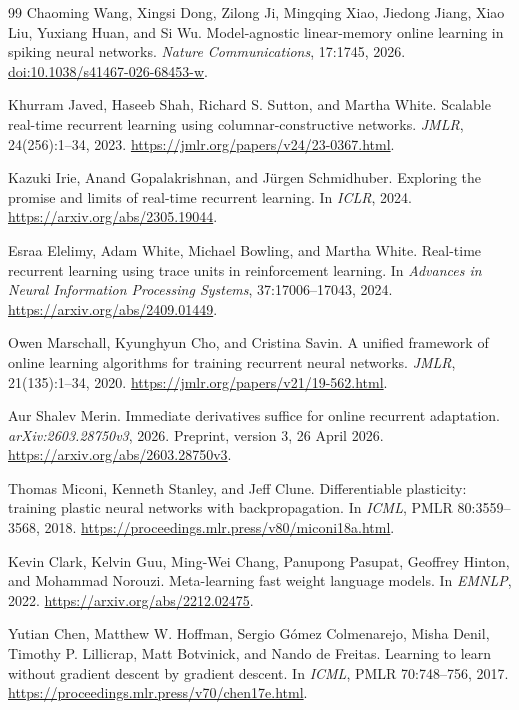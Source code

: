 \documentclass[11pt]{article}
\theoremstyle{definition}
\begin{document}
\begin{thebibliography}{99}
Chaoming Wang, Xingsi Dong, Zilong Ji, Mingqing Xiao, Jiedong Jiang,
Xiao Liu, Yuxiang Huan, and Si Wu.
Model-agnostic linear-memory online learning in spiking neural networks.
\emph{Nature Communications}, 17:1745, 2026.
\href{https://doi.org/10.1038/s41467-026-68453-w}{doi:10.1038/s41467-026-68453-w}.

Khurram Javed, Haseeb Shah, Richard S. Sutton, and Martha White.
Scalable real-time recurrent learning using columnar-constructive networks.
\emph{JMLR}, 24(256):1--34, 2023. \url{https://jmlr.org/papers/v24/23-0367.html}.

Kazuki Irie, Anand Gopalakrishnan, and J{\"u}rgen Schmidhuber.
Exploring the promise and limits of real-time recurrent learning.
In \emph{ICLR}, 2024. \url{https://arxiv.org/abs/2305.19044}.

Esraa Elelimy, Adam White, Michael Bowling, and Martha White.
Real-time recurrent learning using trace units in reinforcement learning.
In \emph{Advances in Neural Information Processing Systems}, 37:17006--17043, 2024.
\url{https://arxiv.org/abs/2409.01449}.

Owen Marschall, Kyunghyun Cho, and Cristina Savin.
A unified framework of online learning algorithms for training recurrent neural networks.
\emph{JMLR}, 21(135):1--34, 2020. \url{https://jmlr.org/papers/v21/19-562.html}.

Aur Shalev Merin. Immediate derivatives suffice for online recurrent adaptation.
\emph{arXiv:2603.28750v3}, 2026. Preprint, version 3, 26 April 2026.
\url{https://arxiv.org/abs/2603.28750v3}.

Thomas Miconi, Kenneth Stanley, and Jeff Clune.
Differentiable plasticity: training plastic neural networks with backpropagation.
In \emph{ICML}, PMLR 80:3559--3568, 2018.
\url{https://proceedings.mlr.press/v80/miconi18a.html}.

Kevin Clark, Kelvin Guu, Ming-Wei Chang, Panupong Pasupat, Geoffrey Hinton,
and Mohammad Norouzi. Meta-learning fast weight language models.
In \emph{EMNLP}, 2022. \url{https://arxiv.org/abs/2212.02475}.

Yutian Chen, Matthew W. Hoffman, Sergio G{\'o}mez Colmenarejo, Misha Denil,
Timothy P. Lillicrap, Matt Botvinick, and Nando de Freitas.
Learning to learn without gradient descent by gradient descent.
In \emph{ICML}, PMLR 70:748--756, 2017.
\url{https://proceedings.mlr.press/v70/chen17e.html}.


\end{thebibliography}
\end{document}

